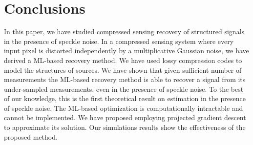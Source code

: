 \documentclass[onecolumn]{IEEEtran}
\begin{document}








%
%
%
%

\section{Conclusions}\label{sec:conc}

In this paper, we have studied compressed sensing recovery of structured signals  in the presence of speckle noise. In a compressed sensing system where every input pixel is distorted independently by a multiplicative Gaussian noise, we have derived a ML-based recovery method. We have used lossy  compression codes to model the structures of sources. We have shown that given sufficient number of measurements the ML-based recovery method is able to recover a signal from its under-sampled measurements, even in the presence of speckle  noise. To the best of our knowledge, this is the first theoretical result on estimation in the presence of speckle noise. The  ML-based optimization is computationally intractable and cannot be implemented. We have proposed employing projected gradient descent to approximate its solution. Our simulations results show the effectiveness of the proposed method. 
\end{document}
